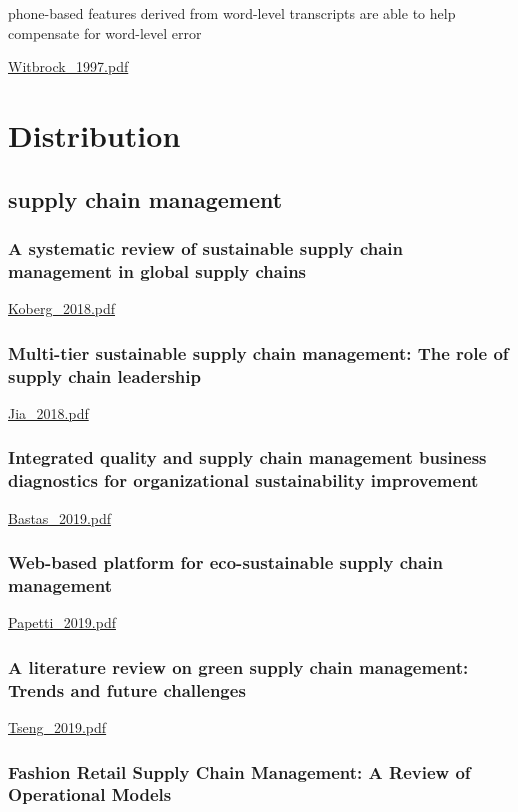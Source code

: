 phone-based features derived from
word-level transcripts are able to help compensate for word-level error

\url{Witbrock_1997.pdf}\cite{Witbrock_1997}

\chapter{Distribution}

\section{supply chain management}

\subsection{A systematic review of sustainable supply chain management in global supply chains}

\url{Koberg_2018.pdf}\cite{Koberg_2018}

\subsection{Multi-tier sustainable supply chain management: The role of supply chain leadership}

\url{Jia_2018.pdf}\cite{Jia_2018}

\subsection{Integrated quality and supply chain management business diagnostics for organizational sustainability improvement}

\url{Bastas_2019.pdf}\cite{Bastas_2019}

\subsection{Web-based platform for eco-sustainable supply chain management}

\url{Papetti_2019.pdf}\cite{Papetti_2019}

\subsection{A literature review on green supply chain management: Trends and future challenges}

\url{Tseng_2019.pdf}\cite{Tseng_2019}

\subsection{Fashion Retail Supply Chain Management: A Review of Operational Models}

